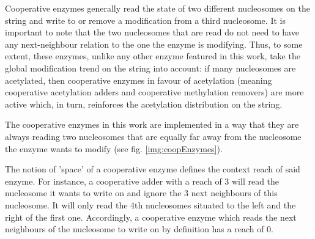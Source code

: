                 Cooperative enzymes generally read the state of two different nucleosomes on the string and write to or remove a modification from a third nucleosome. It is important to note that the two nucleosomes that are read do not need to have any next-neighbour relation to the one the enzyme is modifying.  Thus, to some extent, these enzymes, unlike any other enzyme featured in this work, take the global modification trend on the string into account: if many nucleosomes are acetylated, then cooperative enzymes in favour of acetylation (meaning cooperative acetylation adders and cooperative methylation removers) are more active which, in turn, reinforces the acetylation distribution on the string.

                The cooperative enzymes in this work are implemented in a way that they are always reading two nucleosomes that are equally far away from the nucleosome the enzyme wants to modify (see fig. \ref{img:coopEnzymes}).

                The notion of 'space' of a cooperative enzyme defines the context reach of said enzyme. For instance, a cooperative adder with a reach of 3 will read the nucleosome it wants to write on and ignore the 3 next neighbours of this nucleosome. It will only read the 4th nucleosomes situated to the left and the right of the first one. Accordingly, a cooperative enzyme which reads the next neighbours of the nucleosome to write on by definition has a reach of 0.


